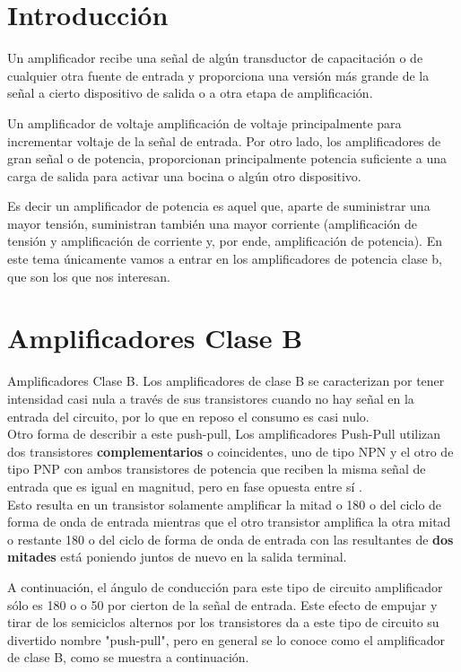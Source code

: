 \documentclass[11pt,a4paper]{article}
\begin{document}
\newpage

\section{Introducción}
Un amplificador recibe una señal de algún transductor de capacitación o de cualquier otra fuente de entrada y proporciona una versión más grande de la señal a cierto dispositivo de salida o a otra etapa de amplificación.

Un amplificador de voltaje amplificación de voltaje principalmente para incrementar voltaje de la señal de entrada. Por otro lado, los amplificadores de gran señal o de potencia, proporcionan principalmente potencia suficiente a una carga de salida para activar una bocina o algún otro dispositivo.

Es decir un amplificador de potencia es aquel que, aparte de suministrar una mayor tensión, suministran también una mayor corriente (amplificación de tensión y amplificación de corriente y, por ende, amplificación de potencia).
En este tema únicamente vamos a entrar en los amplificadores de potencia clase b, que son los que nos interesan.

\section{Amplificadores Clase B}

Amplificadores Clase B. Los amplificadores de clase B se caracterizan por tener intensidad casi nula a través de sus transistores cuando no hay señal en la entrada del circuito, por lo que en reposo el consumo es casi nulo.\\

Otro forma de describir a este push-pull, Los amplificadores Push-Pull utilizan dos transistores \textbf{complementarios} o coincidentes, uno de tipo NPN y el otro de tipo PNP con ambos transistores de potencia que reciben la misma señal de entrada que es igual en magnitud, pero en fase opuesta entre sí . \\
Esto resulta en un transistor solamente amplificar la mitad o 180 o del ciclo de forma de onda de entrada mientras que el otro transistor amplifica la otra mitad o restante 180 o del ciclo de forma de onda de entrada con las resultantes de \textbf{dos mitades} está poniendo juntos de nuevo en la salida terminal.

A continuación, el ángulo de conducción para este tipo de circuito amplificador sólo es 180 o o 50 por cierton de la señal de entrada. Este efecto de empujar y tirar de los semiciclos alternos por los transistores da a este tipo de circuito su divertido nombre "push-pull", pero en general se lo conoce como el amplificador de clase B, como se muestra a continuación.
\end{document}
